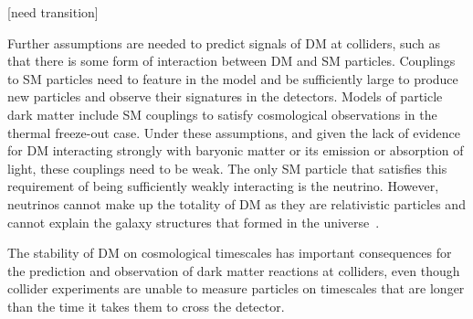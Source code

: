 [need transition]




Further assumptions are needed to predict signals of DM at colliders, such as that there is some form of interaction between DM and SM particles. 
Couplings to SM particles need to feature in the model and be sufficiently large to produce new particles and observe their signatures in the detectors. 
Models of particle dark matter include SM couplings to satisfy cosmological observations in the thermal freeze-out case. 
Under these assumptions, and given the lack of evidence for DM interacting strongly with baryonic matter or its emission or absorption of light, these couplings need to be weak. 
The only SM particle that satisfies this requirement of being sufficiently weakly interacting is the neutrino.
However, neutrinos cannot make up the totality of DM as they are relativistic particles and cannot explain the galaxy structures that formed in the  universe~\cite{PlehnLecturesDM}. 



The stability of DM on cosmological timescales has important consequences for the prediction and observation of dark matter reactions at colliders, even though collider experiments are unable to measure particles on timescales that are longer than the time it takes them to cross the detector. 

\begin{marginnote}[]
\end{marginnote}

